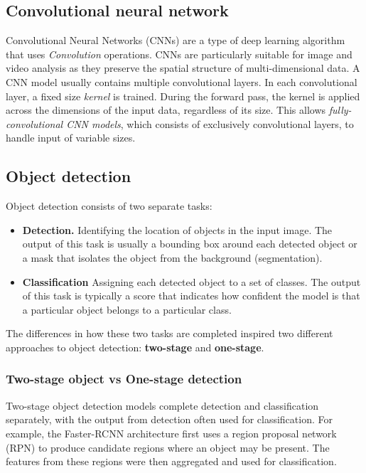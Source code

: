 \documentclass[12pt,a4paper,twoside,openany]{report}
\begin{document}
\subsection{Convolutional neural network}
Convolutional Neural Networks (CNNs) are a type of deep learning algorithm that uses \textit{Convolution} operations. CNNs are particularly suitable for image and video analysis as they preserve the spatial structure of multi-dimensional data. A CNN model usually contains multiple convolutional layers. In each convolutional layer, a fixed size \textit{kernel} is trained. During the forward pass, the kernel is applied across the dimensions of the input data, regardless of its size. This allows \textit{fully-convolutional CNN models}, which consists of exclusively convolutional layers, to handle input of variable sizes.

\subsection{Object detection}
Object detection consists of two separate tasks:
\begin{itemize}
    \item \textbf{Detection.} Identifying the location of objects in the input image. The output of this task is usually a bounding box around each detected object or a mask that isolates the object from the background (segmentation).
    \item \textbf{Classification} Assigning each detected object to a set of classes. The output of this task is typically a score that indicates how confident the model is that a particular object belongs to a particular class.
\end{itemize}

The differences in how these two tasks are completed inspired two different approaches to object detection: \textbf{two-stage} and \textbf{one-stage}.

\subsubsection{Two-stage object vs One-stage detection}
Two-stage object detection models complete detection and classification separately, with the output from detection often used for classification. For example, the Faster-RCNN architecture \cite{ren_faster_2016} first uses a region proposal network (RPN) to produce candidate regions where an object may be present. The features from these regions were then aggregated and used for classification.
\end{document}
